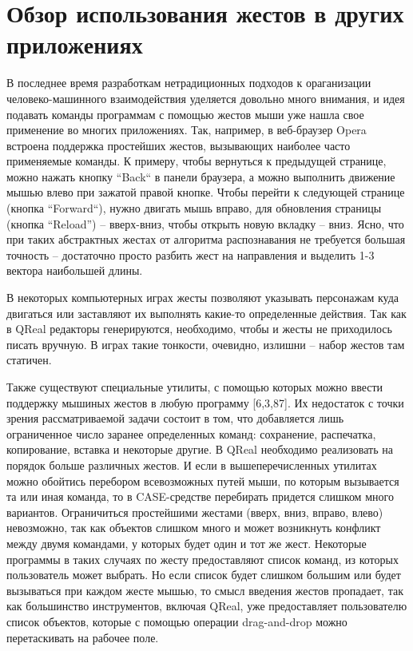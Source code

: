 \documentclass[a5paper]{article}
\begin{document}
\section{Обзор использования жестов в других приложениях}

В последнее время разработкам нетрадиционных подходов к ораганизации человеко-машинного взаимодействия уделяется довольно много 
внимания, и идея подавать команды программам с помощью жестов мыши уже нашла свое применение во многих приложениях. Так, например, 
в веб-браузер Opera встроена поддержка простейших жестов, вызывающих наиболее часто применяемые команды. К примеру, чтобы вернуться 
к предыдущей странице, можно нажать кнопку ``Back`` в панели браузера, а можно выполнить движение мышью влево при зажатой правой кнопке. 
Чтобы перейти к следующей странице (кнопка ``Forward``), нужно двигать мышь вправо, для обновления страницы (кнопка ``Reload'') -- вверх-вниз,
чтобы открыть новую вкладку -- вниз. Ясно, что при таких абстрактных жестах от алгоритма распознавания не требуется
большая точность -- достаточно просто разбить жест на направления и выделить 1-3 вектора наибольшей длины.

В некоторых компьютерных играх жесты позволяют указывать персонажам куда двигаться или заставляют их выполнять какие-то определенные
действия. Так как в QReal редакторы генерируются, необходимо, чтобы и жесты не приходилось писать вручную. В играх такие тонкости, очевидно,
излишни -- набор жестов там статичен.

Также существуют специальные утилиты, с помощью которых можно ввести поддержку мышиных жестов в любую программу [6,3,87]. Их недостаток 
с точки зрения рассматриваемой задачи состоит в том, что добавляется лишь ограниченное число заранее определенных команд: 
сохранение, распечатка, копирование, вставка и некоторые другие. В QReal необходимо реализовать на порядок больше различных жестов. И если в
вышеперечисленных утилитах можно обойтись перебором всевозможных путей мыши, по которым вызывается та или иная команда, то в CASE-средстве 
перебирать придется слишком много вариантов. Ограничиться простейшими жестами (вверх, вниз, вправо, влево) невозможно, так как 
объектов слишком много и может возникнуть конфликт между двумя командами, у которых будет один и тот же жест. Некоторые программы 
в таких случаях по жесту предоставляют список команд, из которых пользователь может выбрать. Но если список будет слишком большим или 
будет вызываться при каждом жесте мышью, то смысл введения жестов пропадает, так как большинство инструментов, включая QReal, уже 
предоставляет пользователю список объектов, которые с помощью операции drag-and-drop можно перетаскивать на рабочее поле.
\end{document}
